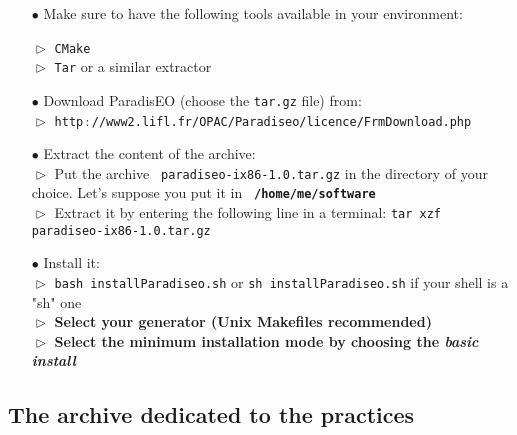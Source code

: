 \documentclass[a4paper]{article}
\begin{document}
    \begin{itemize}
        \item[$\bullet$] Make sure to have the following tools
         available in your environment:

          \hspace{1cm}$\vartriangleright$ {\tt CMake}
          \\\hspace*{1cm}$\vartriangleright$ {\tt Tar} or a similar extractor

       \item[$\bullet$] Download ParadisEO (choose the {\tt tar.gz} file)
       from:
          \\\hspace*{1cm}$\vartriangleright$ {\tt http$\,:$//www2.lifl.fr/OPAC/Paradiseo/licence/FrmDownload.php}

       \item[$\bullet$] Extract the content of the archive:
           \\\hspace*{1cm}$\vartriangleright$ Put the archive {\tt
           paradiseo-ix86-1.0.tar.gz} in the directory of your
           choice. Let's suppose you put it in  \textbf{{\tt
           /home/me/software}}
           \\\hspace*{1cm}$\vartriangleright$ Extract it by entering
    the following line in a terminal: {\tt tar xzf paradiseo-ix86-1.0.tar.gz}

     \item[$\bullet$] Install it:
           \\\hspace*{1cm}$\vartriangleright$ {\tt  bash installParadiseo.sh} or {\tt  sh
            installParadiseo.sh} if your shell is a "sh" one
            \\\hspace*{1cm}$\vartriangleright$ \textbf{Select your generator (Unix Makefiles recommended) }
            \\\hspace*{1cm}$\vartriangleright$ \textbf{Select the minimum installation mode by choosing the \emph{basic install} }


    \end{itemize}


\subsection{The archive dedicated to the practices}
\end{document}
